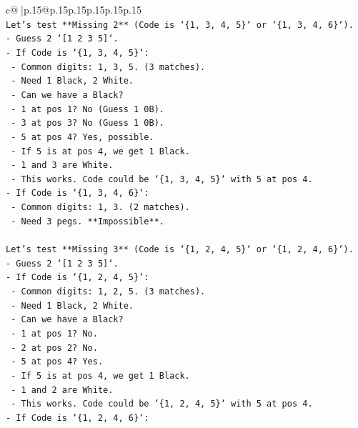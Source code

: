 \documentclass{article}
\begin{document}
{\begin{supertabular}{c@{$\;$}|p{.15\linewidth}@{}p{.15\linewidth}p{.15\linewidth}p{.15\linewidth}p{.15\linewidth}p{.15\linewidth}}
{{{\\ 
\texttt{Let's test **Missing 2** (Code is `\{1, 3, 4, 5\}` or `\{1, 3, 4, 6\}`).} \\
\texttt{{-} Guess 2 `{[}1 2 3 5{]}`.} \\
\texttt{{-} If Code is `\{1, 3, 4, 5\}`:} \\
\texttt{  {-} Common digits: 1, 3, 5. (3 matches).} \\
\texttt{  {-} Need 1 Black, 2 White.} \\
\texttt{  {-} Can we have a Black?} \\
\texttt{    {-} 1 at pos 1? No (Guess 1 0B).} \\
\texttt{    {-} 3 at pos 3? No (Guess 1 0B).} \\
\texttt{    {-} 5 at pos 4? Yes, possible.} \\
\texttt{    {-} If 5 is at pos 4, we get 1 Black.} \\
\texttt{    {-} 1 and 3 are White.} \\
\texttt{    {-} This works. Code could be `\{1, 3, 4, 5\}` with 5 at pos 4.} \\
\texttt{{-} If Code is `\{1, 3, 4, 6\}`:} \\
\texttt{  {-} Common digits: 1, 3. (2 matches).} \\
\texttt{  {-} Need 3 pegs. **Impossible**.} \\
\\ 
\texttt{Let's test **Missing 3** (Code is `\{1, 2, 4, 5\}` or `\{1, 2, 4, 6\}`).} \\
\texttt{{-} Guess 2 `{[}1 2 3 5{]}`.} \\
\texttt{{-} If Code is `\{1, 2, 4, 5\}`:} \\
\texttt{  {-} Common digits: 1, 2, 5. (3 matches).} \\
\texttt{  {-} Need 1 Black, 2 White.} \\
\texttt{  {-} Can we have a Black?} \\
\texttt{    {-} 1 at pos 1? No.} \\
\texttt{    {-} 2 at pos 2? No.} \\
\texttt{    {-} 5 at pos 4? Yes.} \\
\texttt{    {-} If 5 is at pos 4, we get 1 Black.} \\
\texttt{    {-} 1 and 2 are White.} \\
\texttt{    {-} This works. Code could be `\{1, 2, 4, 5\}` with 5 at pos 4.} \\
\texttt{{-} If Code is `\{1, 2, 4, 6\}`:} \\
}}}
\end{supertabular}}
\end{document}
